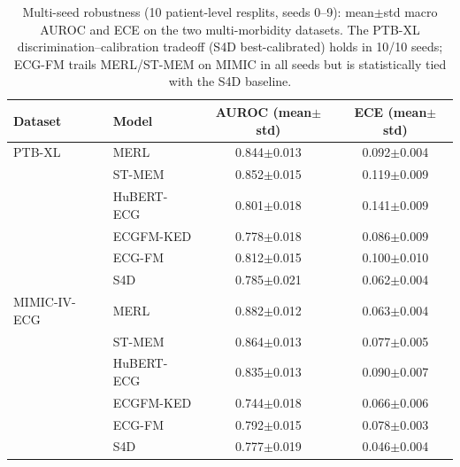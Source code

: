 \begin{table}[t]
\centering
\caption{Multi-seed robustness (10 patient-level resplits, seeds 0--9): mean$\pm$std macro AUROC and ECE on the two multi-morbidity datasets. The PTB-XL discrimination--calibration tradeoff (S4D best-calibrated) holds in 10/10 seeds; ECG-FM trails MERL/ST-MEM on MIMIC in all seeds but is statistically tied with the S4D baseline.}
\label{tab:robustness}
\small
\begin{tabular}{llcc}
\toprule
Dataset & Model & AUROC (mean$\pm$std) & ECE (mean$\pm$std) \\
\midrule
  PTB-XL & MERL & 0.844$\pm$0.013 & 0.092$\pm$0.004 \\
   & ST-MEM & 0.852$\pm$0.015 & 0.119$\pm$0.009 \\
   & HuBERT-ECG & 0.801$\pm$0.018 & 0.141$\pm$0.009 \\
   & ECGFM-KED & 0.778$\pm$0.018 & 0.086$\pm$0.009 \\
   & ECG-FM & 0.812$\pm$0.015 & 0.100$\pm$0.010 \\
   & S4D & 0.785$\pm$0.021 & 0.062$\pm$0.004 \\
  \midrule
  MIMIC-IV-ECG & MERL & 0.882$\pm$0.012 & 0.063$\pm$0.004 \\
   & ST-MEM & 0.864$\pm$0.013 & 0.077$\pm$0.005 \\
   & HuBERT-ECG & 0.835$\pm$0.013 & 0.090$\pm$0.007 \\
   & ECGFM-KED & 0.744$\pm$0.018 & 0.066$\pm$0.006 \\
   & ECG-FM & 0.792$\pm$0.015 & 0.078$\pm$0.003 \\
   & S4D & 0.777$\pm$0.019 & 0.046$\pm$0.004 \\
\bottomrule
\end{tabular}
\end{table}